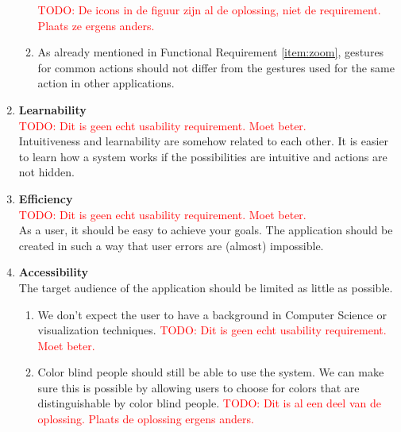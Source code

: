 \begin{enumerate}[label=\textbf{\arabic*}., ref=\arabic*]
\begin{enumerate}
		\textcolor{red}{TODO: De icons in de figuur zijn al de oplossing, niet de requirement. Plaats ze ergens anders.}
	
		\item As already mentioned in Functional Requirement \ref{item:zoom}, gestures for common actions should not differ from the gestures used for the same action in other applications.
				
	\end{enumerate}
	
	\item \textbf{Learnability\label{item:learnability}} \hfill \\
	\textcolor{red}{TODO: Dit is geen echt usability requirement. Moet beter.}\\
	Intuitiveness and learnability are somehow related to each other. It is easier to learn how a system works if the possibilities are intuitive and actions are not hidden.
	
	\item \textbf{Efficiency\label{item:efficiency}} \hfill \\
	\textcolor{red}{TODO: Dit is geen echt usability requirement. Moet beter.}\\
	As a user, it should be easy to achieve your goals. The application should be created in such a way that user errors are (almost) impossible.
	
	\item \textbf{Accessibility\label{item:accessibility}} \hfill \\
	The target audience of the application should be limited as little as possible. 
	\begin{enumerate}
		\item We don't expect the user to have a background in Computer Science or visualization techniques. \textcolor{red}{TODO: Dit is geen echt usability requirement. Moet beter.}
		\item Color blind people should still be able to use the system. We can make sure this is possible by allowing users to choose for colors that are distinguishable by color blind people. \textcolor{red}{TODO: Dit is al een deel van de oplossing. Plaats de oplossing ergens anders.}
	\end{enumerate}
	
\end{enumerate}



